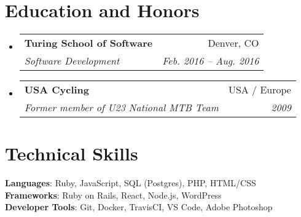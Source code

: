 \documentclass[letterpaper,11pt]{article}
\makeatletter
\newcommand{\resumeSubheading}[4]{
  \vspace{-2pt}\item
    \begin{tabular*}{0.97\textwidth}[t]{l@{\extracolsep{\fill}}r}
      \textbf{#1} & #2 \\
      \textit{\small#3} & \textit{\small #4} \\
    \end{tabular*}\vspace{-7pt}
}
\newcommand{\resumeSubHeadingListStart}{\begin{itemize}[leftmargin=0.15in, label={}]}
\newcommand{\resumeSubHeadingListEnd}{\end{itemize}}
\makeatother
\begin{document}
\section{Education and Honors}
  \resumeSubHeadingListStart
    \resumeSubheading
      {Turing School of Software}{Denver, CO}
      {Software Development}{Feb. 2016 -- Aug. 2016}
    \resumeSubheading
      {USA Cycling}{USA / Europe}
      {Former member of U23 National MTB Team}{2009}
  \resumeSubHeadingListEnd

%
\section{Technical Skills}
 \begin{itemize}[leftmargin=0.15in, label={}]
    \small{\item{
     \textbf{Languages}{: Ruby, JavaScript, SQL (Postgres), PHP, HTML/CSS} \\
     \textbf{Frameworks}{: Ruby on Rails, React, Node.js, WordPress} \\
     \textbf{Developer Tools}{: Git, Docker, TravisCI, VS Code, Adobe Photoshop} \\
    }}
 \end{itemize}

\end{document}
